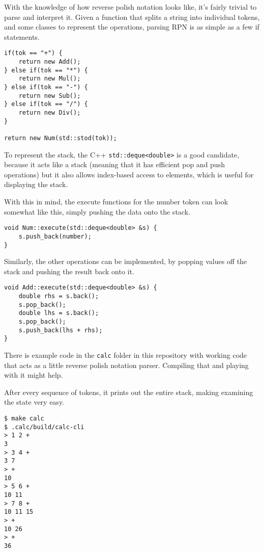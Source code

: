 \documentclass[a4paper,twocolumn]{article}
\begin{document}
With the knowledge of how reverse polish notation looks like, it's fairly trivial to parse and interpret it. Given a function that splits a string into individual tokens, and some classes to represent the operations, parsing RPN is as simple as a few if statements.

\begin{verbatim}
if(tok == "+") {
    return new Add();
} else if(tok == "*") {
    return new Mul();
} else if(tok == "-") {
    return new Sub();
} else if(tok == "/") {
    return new Div();
}

return new Num(std::stod(tok));
\end{verbatim}

To represent the stack, the C++ \verb|std::deque<double>| is a good candidate, because it acts like a stack (meaning that it has efficient pop and push operations) but it also allows index-based access to elements, which is useful for displaying the stack.

With this in mind, the execute functions for the number token can look somewhat like this, simply pushing the data onto the stack.

\begin{verbatim}
void Num::execute(std::deque<double> &s) {                                                                                                                                                           
    s.push_back(number);                                                                                                                                                                                
}  
\end{verbatim}

Similarly, the other operations can be implemented, by popping values off the stack and pushing the result back onto it.

\begin{verbatim}
void Add::execute(std::deque<double> &s) {
    double rhs = s.back();
    s.pop_back();
    double lhs = s.back();
    s.pop_back();
    s.push_back(lhs + rhs);
}  
\end{verbatim}

There is example code in the \verb|calc| folder in this repository with working code that acts as a little reverse polish notation parser. Compiling that and playing with it might help.

After every sequence of tokens, it prints out the entire stack, making examining the state very easy.

\begin{verbatim}
$ make calc
$ .calc/build/calc-cli
> 1 2 +
3
> 3 4 +
3 7
> +
10
> 5 6 +
10 11
> 7 8 +
10 11 15
> +
10 26
> +
36
\end{verbatim}
\end{document}
